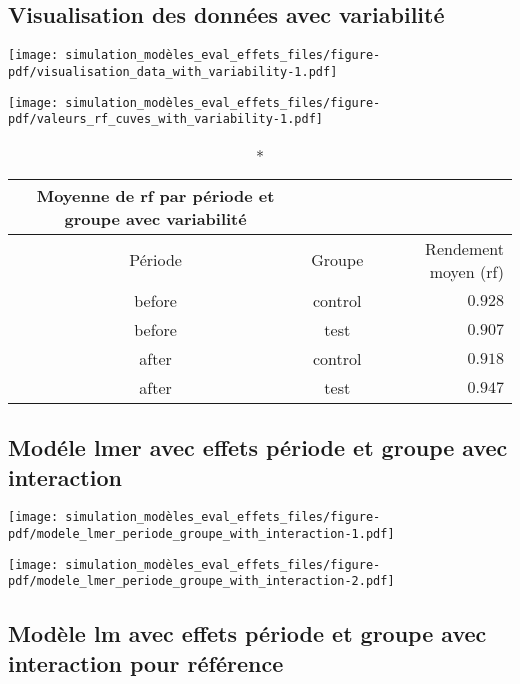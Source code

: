 \documentclass[
  letterpaper,
  DIV=11,
  numbers=noendperiod]{scrartcl}
\begin{document}
\subsection{Visualisation des données avec
variabilité}\label{visualisation-des-donnuxe9es-avec-variabilituxe9}

\texttt{[image: simulation\_modèles\_eval\_effets\_files/figure-pdf/visualisation\_data\_with\_variability-1.pdf]}

\texttt{[image: simulation\_modèles\_eval\_effets\_files/figure-pdf/valeurs\_rf\_cuves\_with\_variability-1.pdf]}

\begin{longtable*}{ccr}
\caption*{
{\large Moyenne de rf par période et groupe avec variabilité}
} \\ 
\toprule
Période & Groupe & Rendement moyen (rf) \\ 
\midrule\addlinespace[2.5pt]
before & control & $0.928$ \\ 
before & test & $0.907$ \\ 
after & control & $0.918$ \\ 
after & test & $0.947$ \\ 
\bottomrule
\end{longtable*}

\subsection{Modéle lmer avec effets période et groupe avec
interaction}\label{moduxe9le-lmer-avec-effets-puxe9riode-et-groupe-avec-interaction}

\texttt{[image: simulation\_modèles\_eval\_effets\_files/figure-pdf/modele\_lmer\_periode\_groupe\_with\_interaction-1.pdf]}

\texttt{[image: simulation\_modèles\_eval\_effets\_files/figure-pdf/modele\_lmer\_periode\_groupe\_with\_interaction-2.pdf]}

\subsection{Modèle lm avec effets période et groupe avec interaction
pour
référence}\label{moduxe8le-lm-avec-effets-puxe9riode-et-groupe-avec-interaction-pour-ruxe9fuxe9rence}
\end{document}
